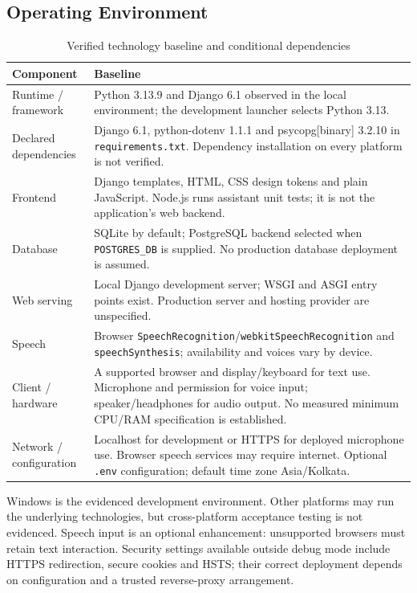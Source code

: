 \documentclass[11pt,a4paper]{article}
\begin{document}
\subsection{Operating Environment}
\begin{table}[H]
\centering\small
\caption{Verified technology baseline and conditional dependencies}
\begin{tabularx}{\textwidth}{L{37mm}Y}
\toprule Component & Baseline\\\midrule
Runtime / framework & Python 3.13.9 and Django 6.1 observed in the local environment; the development launcher selects Python 3.13.\\
Declared dependencies & Django 6.1, python-dotenv 1.1.1 and psycopg[binary] 3.2.10 in \texttt{requirements.txt}. Dependency installation on every platform is not verified.\\
Frontend & Django templates, HTML, CSS design tokens and plain JavaScript. Node.js runs assistant unit tests; it is not the application's web backend.\\
Database & SQLite by default; PostgreSQL backend selected when \texttt{POSTGRES\_DB} is supplied. No production database deployment is assumed.\\
Web serving & Local Django development server; WSGI and ASGI entry points exist. Production server and hosting provider are unspecified.\\
Speech & Browser \texttt{SpeechRecognition}/\texttt{webkitSpeechRecognition} and \texttt{speechSynthesis}; availability and voices vary by device.\\
Client / hardware & A supported browser and display/keyboard for text use. Microphone and permission for voice input; speaker/headphones for audio output. No measured minimum CPU/RAM specification is established.\\
Network / configuration & Localhost for development or HTTPS for deployed microphone use. Browser speech services may require internet. Optional \texttt{.env} configuration; default time zone Asia/Kolkata.\\
\bottomrule
\end{tabularx}
\end{table}
Windows is the evidenced development environment. Other platforms may run the underlying technologies, but cross-platform acceptance testing is not evidenced. Speech input is an optional enhancement: unsupported browsers must retain text interaction. Security settings available outside debug mode include HTTPS redirection, secure cookies and HSTS; their correct deployment depends on configuration and a trusted reverse-proxy arrangement.
\end{document}
